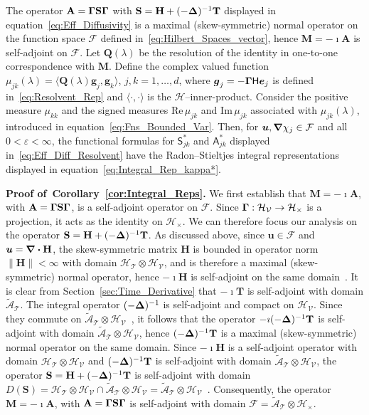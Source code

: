 \documentclass[leqno,onefignum,onetabnum]{siamltex1213}
\newcommand{\secref}[1]{Section~\ref{#1}}
\newcommand{\corref}[1]{Corollary~\ref{#1}}
\newcommand\Real{\mbox{Re}\,} %
\newcommand\Imag{\mbox{Im}\,} %
\newcommand{\Mb}{\mathbf{M}}
\newcommand{\Tb}{\mathbf{T}}
\newcommand{\Hb}{\mathbf{H}}
\newcommand{\Sb}{\mathbf{S}}
\newcommand{\Ab}{\mathbf{A}}
\newcommand{\Qb}{\mathbf{Q}}
\newcommand{\Tc}{\mathcal{T}}
\newcommand{\Vc}{\mathcal{V}}
\newcommand{\Hc}{\mathcal{H}}
\newcommand{\Fc}{\mathcal{F}}
\newcommand{\Ac}{\mathcal{A}}
\newcommand{\Hm}{\mathsf{H}}
\newcommand{\Sm}{\mathsf{S}}
\newcommand{\Am}{\mathsf{A}}
\newcommand\bDelta{\mbox{\boldmath${\Delta}$}}
\newcommand\bGamma{\mbox{\boldmath${\Gamma}$}}
\newcommand\bnabla{\mbox{\boldmath${\nabla}$}}
\providecommand\bcdot{\boldsymbol{\cdot}}
\newcommand{\vecg}{\boldsymbol{g}}
\newcommand{\vecu}{\boldsymbol{u}}
\newcommand{\vece}{\boldsymbol{e}}
\begin{document}
\begin{corollary}\label{cor:Integral_Reps}
  The operator $\Ab=\bGamma\Sb\bGamma$ with
  $\Sb=\Hb+(-\bDelta)^{-1}\Tb$ displayed in
  equation~\eqref{eq:Eff_Diffusivity} is a maximal (skew-symmetric)
  normal operator on the function space $\Fc$ defined
  in~\eqref{eq:Hilbert_Spaces_vector}, hence $\Mb=-\imath\Ab$ is
  self-adjoint on $\Fc$. Let $\Qb(\lambda)$ be the resolution of the
  identity in one-to-one correspondence with $\Mb$. Define the complex
  valued function $\mu_{jk}(\lambda)=\langle\Qb(\lambda)\vecg_j,\vecg_k\rangle$, $j,k=1,\ldots,d$,
  where $ \vecg_j=-\bGamma\Hm\vece_j$ is defined
  in~\eqref{eq:Resolvent_Rep} and $\langle\cdot,\cdot\rangle$ is the
  $\Hc$--inner-product. Consider the positive measure $\mu_{kk}$ and the
  signed measures $\Real\mu_{jk}$ and $\Imag\mu_{jk}$ associated with
  $\mu_{jk}(\lambda)$, introduced in
  equation~\eqref{eq:Fns_Bounded_Var}. Then, for
  $\vecu,\bnabla\chi_j\in\Fc$ and all $0<\varepsilon<\infty$, the functional formulas for
  $\Sm^*_{jk}$ and $\Am^*_{jk}$ displayed
  in~\eqref{eq:Eff_Diff_Resolvent} have the Radon--Stieltjes integral
  representations displayed in
  equation~\eqref{eq:Integral_Rep_kappa*}.     
% 
\end{corollary}
%


\textbf{Proof of~\corref{cor:Integral_Reps}.}\hspace{1ex}
%
We first establish that $\Mb=-\imath \Ab$, with $\Ab=\bGamma\Sb\bGamma$, is
a self-adjoint operator on $\Fc$. Since $\bGamma:\Hc_{\Vc}\to\Hc_\times$ is a
projection, it acts as the identity on $\Hc_\times$. We can therefore focus
our analysis on the operator $\Sb=\Hb+(-\bDelta)^{-1}\Tb$. As
discussed above, since $\vecu\in\Fc$ and $\vecu=\bnabla\bcdot\Hb$, the
skew-symmetric matrix $\Hb$ is bounded in operator norm $\|\Hb\|<\infty$ with
domain $\Hc_{\Tc}\otimes\Hc_{\Vc}$, and is therefore a maximal
(skew-symmetric) normal operator, hence $-\imath\Hb$ is self-adjoint on the same
domain~\cite{Stone:64}. It is clear from \secref{sec:Time_Derivative}
that $-\imath\Tb$ is self-adjoint with domain $\tilde{\Ac}_{\Tc}$. The
integral operator $(-\bDelta)^{-1}$ is self-adjoint and compact on
$\Hc_{\Vc}$. Since they commute on
$\tilde{\Ac}_{\Tc}\otimes\Hc_{\Vc}$~\cite{Folland:99:RealAnalysis}, it
follows that the operator $-\imath(-\bDelta)^{-1}\Tb$ is self-adjoint with
domain $\tilde{\Ac}_{\Tc}\otimes\Hc_{\Vc}$, hence $(-\bDelta)^{-1}\Tb$ is a
maximal (skew-symmetric) normal operator on the same domain.
Since $-\imath\Hb$ is a self-adjoint operator with
domain $\Hc_{\Tc}\otimes\Hc_{\Vc}$ and $(-\bDelta)^{-1}\Tb$ is self-adjoint with
domain $\tilde{\Ac}_{\Tc}\otimes\Hc_{\Vc}$, the operator
$\Sb=\Hb+(-\bDelta)^{-1}\Tb$ is self-adjoint with domain 
$D(\Sb)=\Hc_{\Tc}\otimes\Hc_{\Vc}\cap\tilde{\Ac}_{\Tc}\otimes\Hc_{\Vc}=\tilde{\Ac}_{\Tc}\otimes\Hc_{\Vc}$~\cite{Stone:64}. Consequently,
the operator $\Mb=-\imath\Ab$, with $\Ab=\bGamma\Sb\bGamma$ is self-adjoint
with domain $\Fc=\tilde{\Ac}_{\Tc}\otimes\Hc_\times$.
\end{document}
